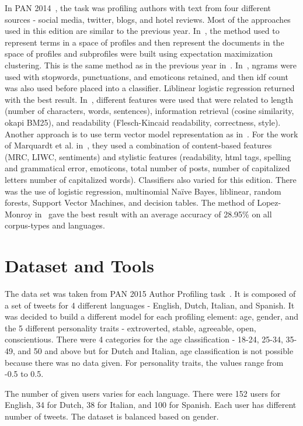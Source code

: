 \documentclass[a4paper]{llncs}
\begin{document}
In PAN 2014~\cite{rangel2014overview}, the task was profiling authors with text from four different sources - social media, twitter, blogs, and hotel reviews. Most of the approaches used in this edition are similar to the previous year. In~\cite{lopezusing}, the method used to represent terms in a space of profiles and then represent the documents in the space of profiles and subprofiles were built using expectation maximization clustering. This is the same method as in the previous year in~\cite{lopez2013inaoe}. In~\cite{maharjansimple}, ngrams were used with stopwords, punctuations, and emoticons retained, and then idf count was also used before placed into a classifier. Liblinear logistic regression returned with the best result. In~\cite{weren6exploring}, different features were used that were related to length (number of characters, words, sentences), information retrieval (cosine similarity, okapi BM25), and readability (Flesch-Kincaid readability, correctness, style). Another approach is to use term vector model representation as in~\cite{villenadaedalus}. For the work of Marquardt et al. in~\cite{marquardt2014age}, they used a combination of content-based features (MRC, LIWC, sentiments) and stylistic features (readability, html tags, spelling and grammatical error, emoticons, total number of posts, number of capitalized letters number of capitalized words). Classifiers also varied for this edition. There was the use of logistic regression, multinomial Naïve Bayes, liblinear, random forests, Support Vector Machines, and decision tables. The method of Lopez-Monroy in~\cite{lopezusing} gave the best result with an average accuracy of 28.95\% on all corpus-types and languages. 

\section{Dataset and Tools}
The data set was taken from PAN 2015 Author Profiling task~\cite{rangel2015overview}. It is composed of a set of tweets for 4 different languages - English, Dutch, Italian, and Spanish. It was decided to build a different model for each profiling element: age, gender, and the 5 different personality traits - extroverted, stable, agreeable, open, conscientious. There were 4 categories for the age classification - 18-24, 25-34, 35-49, and 50 and above but for Dutch and Italian, age classification is not possible because there was no data given. For personality traits, the values range from -0.5 to 0.5.

The number of given users varies for each language. There were 152 users for English, 34 for Dutch, 38 for Italian, and 100 for Spanish. Each user has different number of tweets. The dataset is balanced based on gender. 
\end{document}
